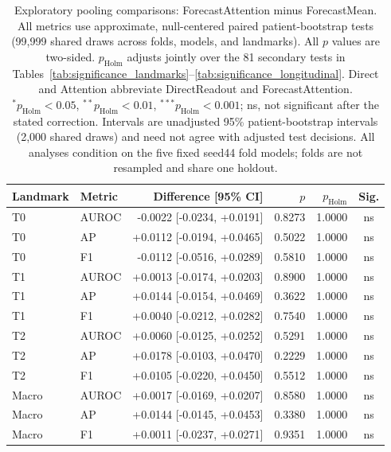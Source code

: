 \begin{table}[t]
\centering
\small
\caption{Exploratory pooling comparisons: ForecastAttention minus ForecastMean. All metrics use approximate, null-centered paired patient-bootstrap tests (99,999 shared draws across folds, models, and landmarks). All $p$ values are two-sided. $p_{\mathrm{Holm}}$ adjusts jointly over the 81 secondary tests in Tables~\ref{tab:significance_landmarks}--\ref{tab:significance_longitudinal}. Direct and Attention abbreviate DirectReadout and ForecastAttention. $^{*}p_{\mathrm{Holm}}<0.05$, $^{**}p_{\mathrm{Holm}}<0.01$, $^{***}p_{\mathrm{Holm}}<0.001$; ns, not significant after the stated correction. Intervals are unadjusted 95\% patient-bootstrap intervals (2,000 shared draws) and need not agree with adjusted test decisions. All analyses condition on the five fixed seed44 fold models; folds are not resampled and share one holdout.}
\label{tab:significance_pooling}
\begin{tabular}{llrrrc}
\toprule
Landmark & Metric & Difference [95\% CI] & $p$ & $p_{\mathrm{Holm}}$ & Sig. \\
\midrule
T0 & AUROC & -0.0022 [-0.0234, +0.0191] & 0.8273 & 1.0000 & ns \\
T0 & AP & +0.0112 [-0.0194, +0.0465] & 0.5022 & 1.0000 & ns \\
T0 & F1 & -0.0112 [-0.0516, +0.0289] & 0.5810 & 1.0000 & ns \\
T1 & AUROC & +0.0013 [-0.0174, +0.0203] & 0.8900 & 1.0000 & ns \\
T1 & AP & +0.0144 [-0.0154, +0.0469] & 0.3622 & 1.0000 & ns \\
T1 & F1 & +0.0040 [-0.0212, +0.0282] & 0.7540 & 1.0000 & ns \\
T2 & AUROC & +0.0060 [-0.0125, +0.0252] & 0.5291 & 1.0000 & ns \\
T2 & AP & +0.0178 [-0.0103, +0.0470] & 0.2229 & 1.0000 & ns \\
T2 & F1 & +0.0105 [-0.0220, +0.0450] & 0.5512 & 1.0000 & ns \\
Macro & AUROC & +0.0017 [-0.0169, +0.0207] & 0.8580 & 1.0000 & ns \\
Macro & AP & +0.0144 [-0.0145, +0.0453] & 0.3380 & 1.0000 & ns \\
Macro & F1 & +0.0011 [-0.0237, +0.0271] & 0.9351 & 1.0000 & ns \\
\bottomrule
\end{tabular}
\end{table}

